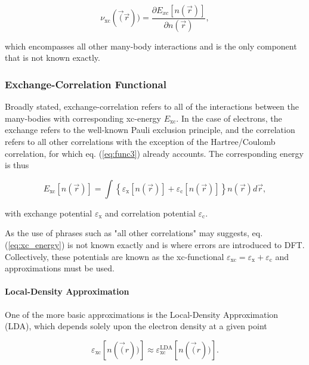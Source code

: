         \begin{equation}
            \nu_\text{xc}(\vec(\vec{r})) = \frac{\partial E_{xc}[n(\vec{r})]}{\partial n(\vec{r})},
        \end{equation}
        
        \noident which encompasses all other many-body interactions and is the only component that is not known exactly.
        
        \subsubsection{Exchange-Correlation Functional}
        
        Broadly stated, exchange-correlation refers to all of the interactions between the many-bodies with corresponding xc-energy $E_\text{xc}$. In the case of electrons, the exchange refers to the well-known Pauli exclusion principle, and the correlation refers to all other correlations with the exception of the Hartree/Coulomb correlation, for which eq. (\ref{eq:func3}) already accounts. The corresponding energy is thus
        
        \begin{equation}
            \label{eq:xc_energy}
            E_\text{xc}[n(\Vec{r})]= \int \left\{ \varepsilon_\text{x}[n(\Vec{r})] + \varepsilon_\text{c}[n(\Vec{r})]\right\} n(\vec{r})d\vec{r},
        \end{equation}
        
        \noindent with exchange potential $\varepsilon_\text{x}$ and correlation potential $\varepsilon_\text{c}$.
        
        As the use of phrases such as "all other correlations" may suggests, eq. (\ref{eq:xc_energy}) is not known exactly and is where errors are introduced to DFT. Collectively, these potentials are known as the xc-functional $\varepsilon_\text{xc} = \varepsilon_\text{x} + \varepsilon_\text{c}$ and approximations must be used.
        
        \paragraph{Local-Density Approximation} One of the more basic approximations is the Local-Density Approximation (LDA), which depends solely upon the electron density at a given point
        
        \begin{equation}
            \varepsilon_\text{xc}[n(\vec(r))] \approx \varepsilon_\text{xc}^\text{LDA}[n(\vec(r))].
        \end{equation}
        

